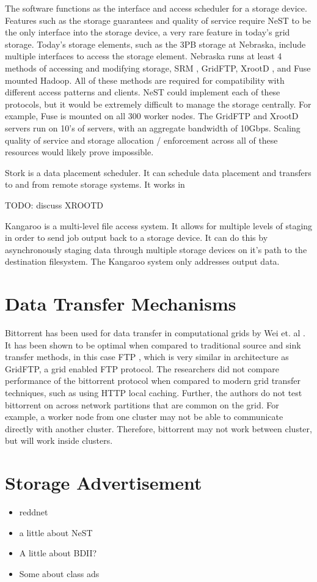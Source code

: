 The software functions as the interface and access scheduler for a storage device.  Features such as the storage guarantees and quality of service require NeST to be the only interface into the storage device, a very rare feature in today's grid storage.  Today's storage elements, such as the 3PB storage at Nebraska, include multiple interfaces to access the storage element.  Nebraska runs at least 4 \cite{attebury2009hadoop} methods of accessing and modifying storage, SRM \cite{shoshani2002storage}, GridFTP, XrootD \cite{dorigo2005xrootd}, and Fuse \cite{szeredi2010fuse} mounted Hadoop.  All of these methods are required for compatibility with different access patterns and clients.  NeST could implement each of these protocols, but it would be extremely difficult to manage the storage centrally.  For example, Fuse is mounted on all 300 worker nodes.  The GridFTP and XrootD servers run on 10's of servers, with an aggregate bandwidth of 10Gbps.  Scaling quality of service and storage allocation / enforcement across all of these resources would likely prove impossible.

Stork \cite{kosar2004stork} is a data placement scheduler.  It can schedule data placement and transfers to and from remote storage systems.  It works in

TODO: discuss XROOTD

Kangaroo \cite{thain2001kangaroo} is a multi-level file access system.  It allows for multiple levels of staging in order to send job output back to a storage device.  It can do this by asynchronously staging data through multiple storage devices on it's path to the destination filesystem.  The Kangaroo system only addresses output data.

\section{Data Transfer Mechanisms}

Bittorrent has been used for data transfer in computational grids by Wei et. al \cite{wei2005collaborative, wei2005scheduling, wei2007towards}.  It has been shown to be optimal when compared to traditional source and sink transfer methods, in this case FTP \cite{postel1985file}, which is very similar in architecture as GridFTP, a grid enabled FTP protocol.  The researchers did not compare performance of the bittorrent protocol when compared to modern grid transfer techniques, such as using HTTP local caching.  Further, the authors do not test bittorrent on across network partitions that are common on the grid.  For example, a worker node from one cluster may not be able to communicate directly with another cluster.  Therefore, bittorrent may not work between cluster, but will work inside clusters.

\section{Storage Advertisement}

\begin{itemize}
\item reddnet
\item a little about NeST
\item A little about BDII?
\item Some about class ads
\end{itemize}





